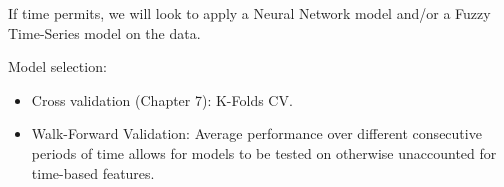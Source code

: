 \documentclass[11pt]{article}
\begin{document}
\begin{itemize}
    
\end{itemize}

{\flushleft If time permits, we will look to apply a Neural Network model and/or a Fuzzy Time-Series model on the data.\par}

Model selection: 
\begin{itemize}
    \item Cross validation (Chapter 7): K-Folds CV.
    \item Walk-Forward Validation: Average performance over different consecutive periods of time allows for models to be tested on otherwise unaccounted for time-based features.
\end{itemize}
\end{document}

